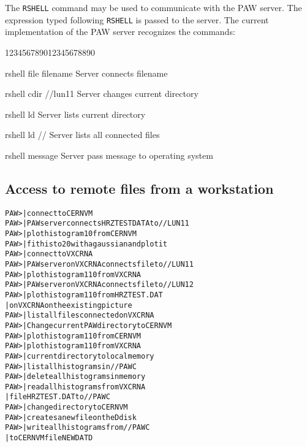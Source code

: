 The \texttt{RSHELL} command may be used to communicate with the PAW server.
The expression typed following \texttt{RSHELL} is passed to the server. The current
implementation of the PAW server recognizes the commands:
\begin{DLtt}{123456789012345678890}
\item[rshell file filename]Server connects filename
\item[rshell cdir //lun11] Server changes current directory
\item[rshell ld]           Server lists current directory
\item[rshell ld //]        Server lists all connected files
\item[rshell message]      Server pass message to operating system
\end{DLtt}
 
\subsection*{Access to remote files from a workstation}
\begin{alltt}
PAW >                          | connect to CERNVM
PAW >                | PAW server connects HRZTEST DAT A to //LUN11
PAW >                          | plot histogram 10 from CERNVM
PAW >                         | fit histo 20 with a gaussian and plot it
PAW >                          | connect to VXCRNA
PAW >   | PAW server on VXCRNA connects file to //LUN11
PAW >                         | plot histogram 110 from VXCRNA
PAW >                | PAW server on VXCRNA connects file to //LUN12
PAW >                       | plot histogram 110 from HRZTEST.DAT
                                            | on VXCRNA on the existing picture
PAW >                           | list all files connected on VXCRNA
PAW >                          | Change current PAW directory to CERNVM
PAW >                         | plot histogram 110 from CERNVM
PAW >                | plot histogram 110 from VXCRNA
PAW >                            | current directory to local memory
PAW >                             | list all histograms in //PAWC
PAW >                         | delete all histograms in memory
PAW >                        | read all histograms from VXCRNA
                                            | file HRZTEST.DAT to //PAWC
PAW >                          | change directory to CERNVM
PAW >           | creates a new file on the D disk
PAW >                                | write all histograms from //PAWC
                                            | to CERNVM file NEW DAT D
\end{alltt}
 
